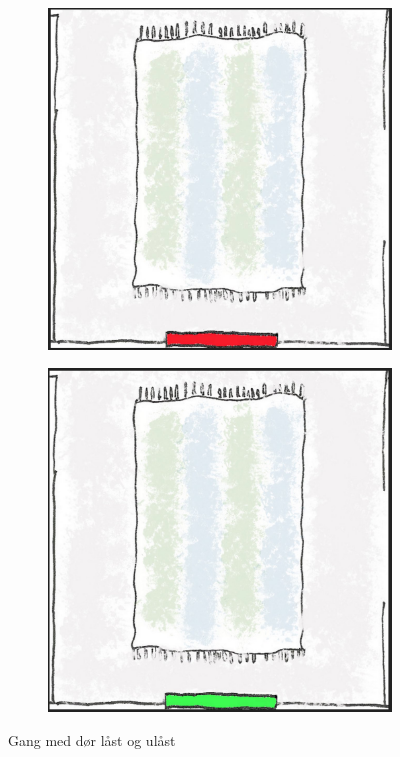 \begin{figure}[ht]
\centering
\begin{subfigure}{0.32\textwidth}
\centering
\includegraphics[scale=0.1]{fig/hall}
\caption{}
\label{fig:halllocked}
\end{subfigure}
\begin{subfigure}{0.32\textwidth}
\centering
\includegraphics[scale=0.1]{fig/hall2}
\caption{}
\label{fig:hallopen}
\end{subfigure}
\caption{Gang med dør låst og ulåst}
\label{fig:halllockedopen}
\end{figure}
